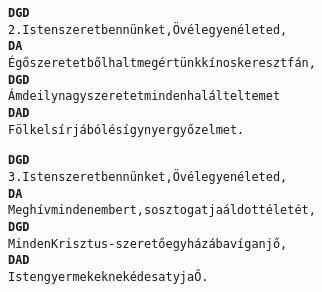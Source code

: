 \cleardoublepage
{}
\kottastart
{}
\kottaend
\begin{minipage}{\textwidth}
\begin{alltt}
\textbf{           D               G              D}
2. Isten szeret bennünket, Övé legyen életed,
\textbf{         D                          A}
   Égő szeretetből halt meg értünk kínos keresztfán,
\textbf{        D                         G          D}
   Ámde ily nagy szeretet minden halált eltemet
\textbf{          D           A               D}
   Fölkel sírjából és így nyer győzelmet.
\end{alltt}
\vspace{0.0cm}
\versszakspacing
\end{minipage}
\begin{minipage}{\textwidth}
\begin{alltt}
\textbf{   D                            G          D}
3. Isten szeret bennünket, Övé legyen életed,
\textbf{           D                          A}
   Meghív minden embert, s osztogatja áldott életét,
\textbf{            D                    G          D}
   Minden Krisztus-szerető egyházába vígan jő,
\textbf{          D          A         D}
   Istengyermekeknek édesatyja Ő.
\end{alltt}
\vspace{0.0cm}
\versszakspacing
\end{minipage}
~\vspace{1.0cm}
\newline
